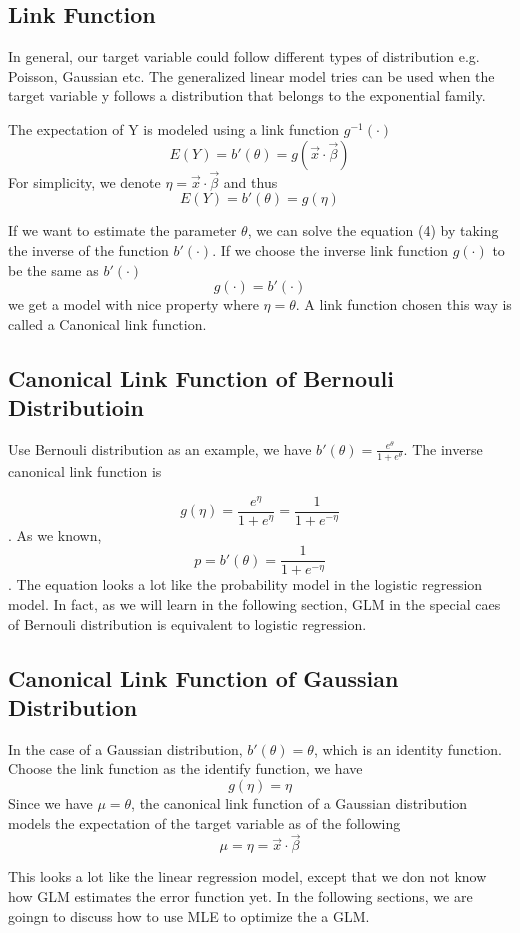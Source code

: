 \documentclass[12pt, oneside]{article}
\begin{document}
\subsection{Link Function}
In general, our target variable could follow different types of distribution e.g. Poisson, Gaussian etc. The generalized linear model tries can be used when the target variable y follows a distribution that belongs to the exponential family. 

The expectation of Y is modeled using a link function $g^{-1}(\cdot)$ 
$$E(Y)=b'(\theta)=g(\vec{x}\cdot\vec{\beta})$$
For simplicity, we denote $\eta=\vec{x}\cdot\vec{\beta}$ and thus 
\begin{equation}
E(Y)=b'(\theta)=g(\eta)
\end{equation}


If we want to estimate the parameter $\theta$, we can solve the equation (4) by taking the inverse of the function $b'(\cdot)$. If we choose the inverse link function $g(\cdot)$ to be the same as $b'(\cdot)$
\begin{equation}
g(\cdot)=b'(\cdot)
\end{equation}
we get a model with nice property where $\eta=\theta$. A link function chosen this way is called a Canonical link function.

\subsection{Canonical Link Function of Bernouli Distributioin}
Use Bernouli distribution as an example, we have $b'(\theta)=\frac{e^\theta}{1+e^\theta}$. The inverse canonical link function is 

$$g(\eta)=\frac{e^{\eta}}{1+e^{\eta}}=\frac{1}{1+e^{-\eta}}$$. As we known,  $$p=b'(\theta)=\frac{1}{1+e^{-\eta}}$$. The equation looks a lot like the probability model in the logistic regression model. In fact, as we will learn in the following section, GLM in the special caes of Bernouli distribution is equivalent to logistic regression.

\subsection{Canonical Link Function of Gaussian Distribution}
In the case of a Gaussian distribution, $b'(\theta)=\theta$, which is an identity function. Choose the link function as the identify function, we have 
$$g(\eta)=\eta$$
Since we have $\mu=\theta$, the canonical link function of a Gaussian distribution models the expectation of the target variable as of the following
$$\mu=\eta=\vec{x}\cdot\vec{\beta}$$ 

This looks a lot like the linear regression model, except that we don not know how GLM estimates the error function yet. In the following sections, we are goingn to discuss how to use MLE to optimize the a GLM.
\end{document}
